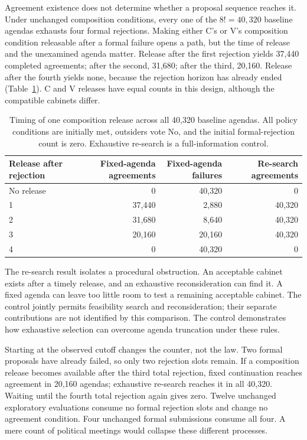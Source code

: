 \documentclass[11pt,a4paper]{article}
\begin{document}
Agreement existence does not determine whether a proposal sequence reaches it. Under unchanged composition conditions, every one of the \(8!=40{,}320\) baseline agendas exhausts four formal rejections. Making either C's or V's composition condition releasable after a formal failure opens a path, but the time of release and the unexamined agenda matter. Release after the first rejection yields 37,440 completed agreements; after the second, 31,680; after the third, 20,160. Release after the fourth yields none, because the rejection horizon has already ended (Table~\ref{tab:agenda}). C and V releases have equal counts in this design, although the compatible cabinets differ.

\begin{table}[tbp]\centering
\caption{Timing of one composition release across all 40,320 baseline agendas. All policy conditions are initially met, outsiders vote No, and the initial formal-rejection count is zero. Exhaustive re-search is a full-information control.}
\label{tab:agenda}
\begin{tabular}{lrrr}
\toprule
Release after rejection & Fixed-agenda agreements & Fixed-agenda failures & Re-search agreements\\
\midrule
No release & 0 & 40,320 & 0\\
1 & 37,440 & 2,880 & 40,320\\
2 & 31,680 & 8,640 & 40,320\\
3 & 20,160 & 20,160 & 40,320\\
4 & 0 & 40,320 & 0\\
\bottomrule
\end{tabular}
\end{table}

The re-search result isolates a procedural obstruction. An acceptable cabinet exists after a timely release, and an exhaustive reconsideration can find it. A fixed agenda can leave too little room to test a remaining acceptable cabinet. The control jointly permits feasibility search and reconsideration; their separate contributions are not identified by this comparison. The control demonstrates how exhaustive selection can overcome agenda truncation under these rules.

Starting at the observed cutoff changes the counter, not the law. Two formal proposals have already failed, so only two rejection slots remain. If a composition release becomes available after the third total rejection, fixed continuation reaches agreement in 20,160 agendas; exhaustive re-search reaches it in all 40,320. Waiting until the fourth total rejection again gives zero. Twelve unchanged exploratory evaluations consume no formal rejection slots and change no agreement condition. Four unchanged formal submissions consume all four. A mere count of political meetings would collapse these different processes.
\end{document}
